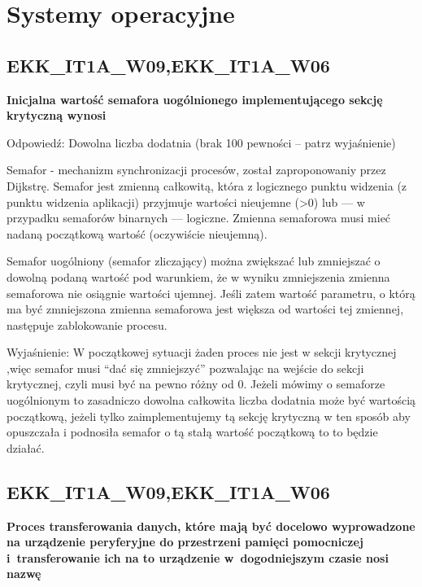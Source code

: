 \chapter{Systemy operacyjne}
\PartialToc
\section{EKK\_IT1A\_W09,EKK\_IT1A\_W06}
\textbf{Inicjalna wartość semafora uogólnionego implementującego sekcję krytyczną wynosi}

\vspace{0.4cm}

Odpowiedź: Dowolna liczba dodatnia (brak 100 pewności -- patrz wyjaśnienie)

Semafor - mechanizm synchronizacji procesów, został zaproponowaniy przez Dijkstrę.
Semafor jest zmienną całkowitą, która z logicznego punktu widzenia (z punktu widzenia aplikacji) przyjmuje wartości nieujemne (>0) lub — w przypadku semaforów binarnych — logiczne. Zmienna semaforowa musi mieć nadaną początkową wartość (oczywiście nieujemną).

Semafor uogólniony (semafor zliczający) można zwiększać lub zmniejszać o dowolną podaną wartość pod warunkiem, że w wyniku zmniejszenia zmienna semaforowa nie osiągnie wartości ujemnej. Jeśli zatem wartość parametru, o którą ma być zmniejszona zmienna semaforowa jest większa od wartości tej zmiennej, następuje zablokowanie procesu.

Wyjaśnienie: W początkowej sytuacji żaden proces nie jest w sekcji krytycznej ,więc semafor musi “dać się zmniejszyć” pozwalając na wejście do sekcji krytycznej, czyli musi być na pewno różny od 0. Jeżeli mówimy o semaforze uogólnionym to zasadniczo dowolna całkowita liczba dodatnia może być wartością początkową, jeżeli tylko zaimplementujemy tą sekcję krytyczną w ten sposób aby opuszczała i podnosiła semafor o tą stałą wartość początkową to to będzie działać.


\section{EKK\_IT1A\_W09,EKK\_IT1A\_W06}
\textbf{Proces transferowania danych, które mają być docelowo wyprowadzone na urządzenie peryferyjne do przestrzeni pamięci pomocniczej i~transferowanie ich na to urządzenie w~dogodniejszym czasie nosi nazwę}

